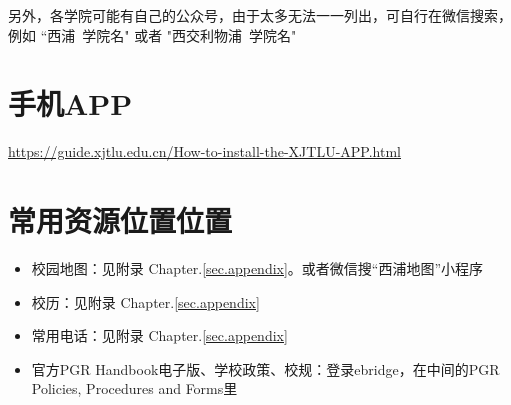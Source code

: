 另外，各学院可能有自己的公众号，由于太多无法一一列出，可自行在微信搜索，例如 “西浦\ {学院名}" 或者 "西交利物浦\ {学院名}"

\section{手机APP}
\url{https://guide.xjtlu.edu.cn/How-to-install-the-XJTLU-APP.html}

\section{常用资源位置位置}
\begin{itemize}
    \item 校园地图：见附录 Chapter.\ref{sec.appendix}。或者微信搜“西浦地图”小程序
    \item 校历：见附录 Chapter.\ref{sec.appendix}
    \item 常用电话：见附录 Chapter.\ref{sec.appendix}
    \item 官方PGR Handbook电子版、学校政策、校规：登录ebridge，在中间的PGR Policies, Procedures and Forms里
\end{itemize}

